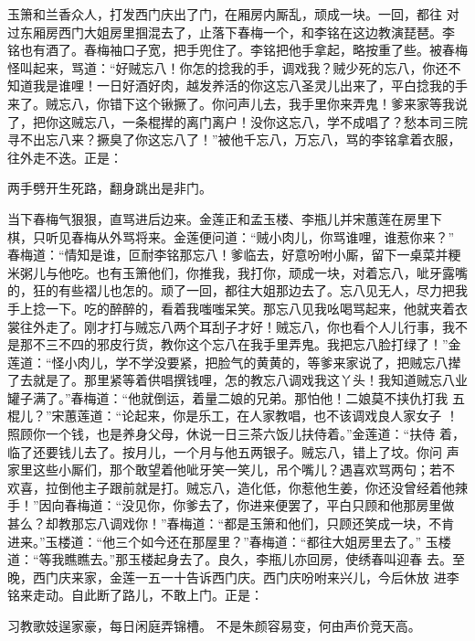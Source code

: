 玉箫和兰香众人，打发西门庆出了门，在厢房内厮乱，顽成一块。一回，都往
对过东厢房西门大姐房里掴混去了，止落下春梅一个，和李铭在这边教演琵琶。李
铭也有酒了。春梅袖口子宽，把手兜住了。李铭把他手拿起，略按重了些。被春梅
怪叫起来，骂道：“好贼忘八！你怎的捻我的手，调戏我？贼少死的忘八，你还不
知道我是谁哩！一日好酒好肉，越发养活的你这忘八圣灵儿出来了，平白捻我的手
来了。贼忘八，你错下这个锹撅了。你问声儿去，我手里你来弄鬼！爹来家等我说
了，把你这贼忘八，一条棍撵的离门离户！没你这忘八，学不成唱了？愁本司三院
寻不出忘八来？撅臭了你这忘八了！”被他千忘八，万忘八，骂的李铭拿着衣服，
往外走不迭。正是：

两手劈开生死路，翻身跳出是非门。

当下春梅气狠狠，直骂进后边来。金莲正和孟玉楼、李瓶儿并宋蕙莲在房里下
棋，只听见春梅从外骂将来。金莲便问道：“贼小肉儿，你骂谁哩，谁惹你来？”
春梅道：“情知是谁，叵耐李铭那忘八！爹临去，好意吩咐小厮，留下一桌菜并粳
米粥儿与他吃。也有玉箫他们，你推我，我打你，顽成一块，对着忘八，呲牙露嘴
的，狂的有些褶儿也怎的。顽了一回，都往大姐那边去了。忘八见无人，尽力把我
手上捻一下。吃的醉醉的，看着我嗤嗤呆笑。那忘八见我吆喝骂起来，他就夹着衣
裳往外走了。刚才打与贼忘八两个耳刮子才好！贼忘八，你也看个人儿行事，我不
是那不三不四的邪皮行货，教你这个忘八在我手里弄鬼。我把忘八脸打绿了！”金
莲道：“怪小肉儿，学不学没要紧，把脸气的黄黄的，等爹来家说了，把贼忘八撵
了去就是了。那里紧等着供唱撰钱哩，怎的教忘八调戏我这丫头！我知道贼忘八业
罐子满了。”春梅道：“他就倒运，着量二娘的兄弟。那怕他！二娘莫不挟仇打我
五棍儿？”宋蕙莲道：“论起来，你是乐工，在人家教唱，也不该调戏良人家女子
！照顾你一个钱，也是养身父母，休说一日三茶六饭儿扶侍着。”金莲道：“扶侍
着，临了还要钱儿去了。按月儿，一个月与他五两银子。贼忘八，错上了坟。你问
声家里这些小厮们，那个敢望着他呲牙笑一笑儿，吊个嘴儿？遇喜欢骂两句；若不
欢喜，拉倒他主子跟前就是打。贼忘八，造化低，你惹他生姜，你还没曾经着他辣
手！”因向春梅道：“没见你，你爹去了，你进来便罢了，平白只顾和他那房里做
甚么？却教那忘八调戏你！”春梅道：“都是玉箫和他们，只顾还笑成一块，不肯
进来。”玉楼道：“他三个如今还在那屋里？”春梅道：“都往大姐房里去了。”
玉楼道：“等我瞧瞧去。”那玉楼起身去了。良久，李瓶儿亦回房，使绣春叫迎春
去。至晚，西门庆来家，金莲一五一十告诉西门庆。西门庆吩咐来兴儿，今后休放
进李铭来走动。自此断了路儿，不敢上门。正是：

习教歌妓逞家豪，每日闲庭弄锦槽。
不是朱颜容易变，何由声价竞天高。